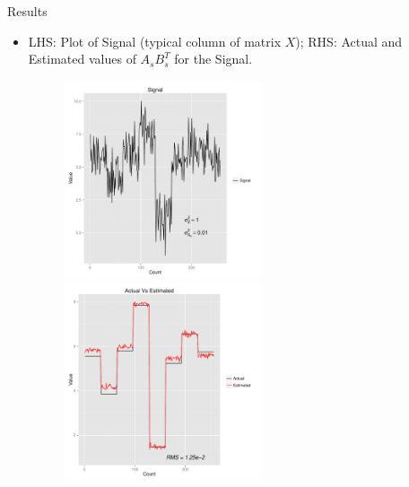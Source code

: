 \documentclass{beamer}
\begin{document}
\begin{frame}{Results}{}
	\begin{itemize}		
		\item{LHS: Plot of Signal (typical column of matrix $X$); \newline
		RHS: Actual and Estimated values of $A_sB^T_s$ for the Signal.}\vspace{0 in}				
	\begin{figure}
		\begin{itemize}
			\begin{center}
				\vspace*{-0.1 in}
				\hspace*{-0.6in}
				\includegraphics[width=0.55\textwidth]{Signal.pdf} 
	 			 \includegraphics[width=0.55\textwidth]{SVDperf.pdf} 
			\end{center}
		\end{itemize}
	\end{figure}
		\vspace{-0.in}
		\end{itemize}
\end{frame}
\end{document}
